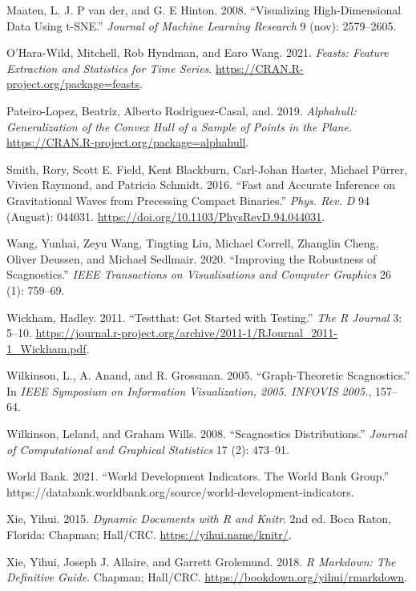 \begin{CSLReferences}{1}{0}
\leavevmode{}%
Maaten, L. J. P van der, and G. E Hinton. 2008. {``Visualizing High-Dimensional Data Using t-SNE.''} \emph{Journal of Machine Learning Research} 9 (nov): 2579--2605.

\leavevmode{}%
O'Hara-Wild, Mitchell, Rob Hyndman, and Earo Wang. 2021. \emph{Feasts: Feature Extraction and Statistics for Time Series}. \url{https://CRAN.R-project.org/package=feasts}.

\leavevmode{}%
Pateiro-Lopez, Beatriz, Alberto Rodriguez-Casal, and. 2019. \emph{Alphahull: Generalization of the Convex Hull of a Sample of Points in the Plane}. \url{https://CRAN.R-project.org/package=alphahull}.

\leavevmode{}%
Smith, Rory, Scott E. Field, Kent Blackburn, Carl-Johan Haster, Michael Pürrer, Vivien Raymond, and Patricia Schmidt. 2016. {``Fast and Accurate Inference on Gravitational Waves from Precessing Compact Binaries.''} \emph{Phys. Rev. D} 94 (August): 044031. \url{https://doi.org/10.1103/PhysRevD.94.044031}.

\leavevmode{}%
Wang, Yunhai, Zeyu Wang, Tingting Liu, Michael Correll, Zhanglin Cheng, Oliver Deussen, and Michael Sedlmair. 2020. {``Improving the Robustness of Scagnostics.''} \emph{IEEE Transactions on Visualisations and Computer Graphics} 26 (1): 759--69.

\leavevmode{}%
Wickham, Hadley. 2011. {``Testthat: Get Started with Testing.''} \emph{The R Journal} 3: 5--10. \url{https://journal.r-project.org/archive/2011-1/RJournal_2011-1_Wickham.pdf}.

\leavevmode{}%
Wilkinson, L., A. Anand, and R. Grossman. 2005. {``Graph-Theoretic Scagnostics.''} In \emph{IEEE Symposium on Information Visualization, 2005. INFOVIS 2005.}, 157--64.

\leavevmode{}%
Wilkinson, Leland, and Graham Wills. 2008. {``Scagnostics Distributions.''} \emph{Journal of Computational and Graphical Statistics} 17 (2): 473--91.

\leavevmode{}%
World Bank. 2021. {``{World Development Indicators. The World Bank Group}.''} https://databank.worldbank.org/source/world-development-indicators.

\leavevmode{}%
Xie, Yihui. 2015. \emph{Dynamic Documents with {R} and Knitr}. 2nd ed. Boca Raton, Florida: Chapman; Hall/CRC. \url{https://yihui.name/knitr/}.

\leavevmode{}%
Xie, Yihui, Joseph J. Allaire, and Garrett Grolemund. 2018. \emph{R Markdown: The Definitive Guide}. Chapman; Hall/CRC. \url{https://bookdown.org/yihui/rmarkdown}.

\end{CSLReferences}


